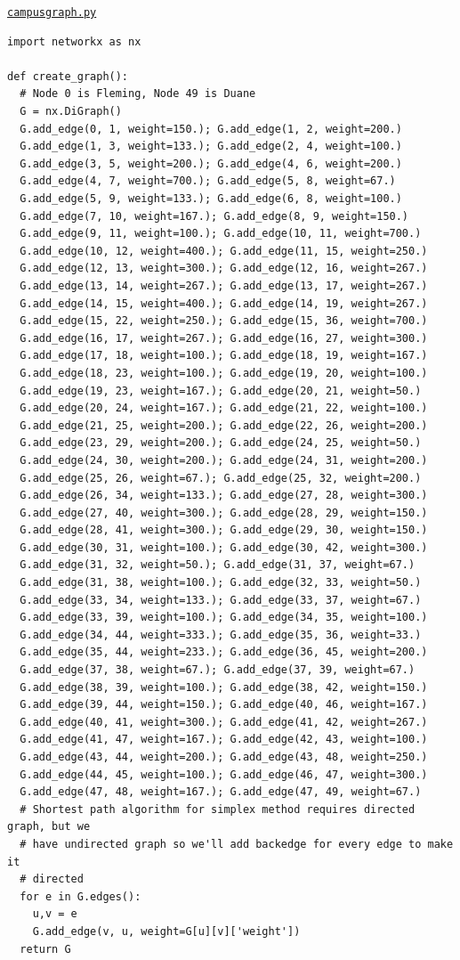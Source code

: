 \newpage
\underline{\texttt{campusgraph.py}}
\begin{footnotesize}
\begin{verbatim}
import networkx as nx

def create_graph():
  # Node 0 is Fleming, Node 49 is Duane
  G = nx.DiGraph()
  G.add_edge(0, 1, weight=150.); G.add_edge(1, 2, weight=200.)
  G.add_edge(1, 3, weight=133.); G.add_edge(2, 4, weight=100.)
  G.add_edge(3, 5, weight=200.); G.add_edge(4, 6, weight=200.)
  G.add_edge(4, 7, weight=700.); G.add_edge(5, 8, weight=67.)
  G.add_edge(5, 9, weight=133.); G.add_edge(6, 8, weight=100.)
  G.add_edge(7, 10, weight=167.); G.add_edge(8, 9, weight=150.)
  G.add_edge(9, 11, weight=100.); G.add_edge(10, 11, weight=700.)
  G.add_edge(10, 12, weight=400.); G.add_edge(11, 15, weight=250.)
  G.add_edge(12, 13, weight=300.); G.add_edge(12, 16, weight=267.)
  G.add_edge(13, 14, weight=267.); G.add_edge(13, 17, weight=267.)
  G.add_edge(14, 15, weight=400.); G.add_edge(14, 19, weight=267.)
  G.add_edge(15, 22, weight=250.); G.add_edge(15, 36, weight=700.)
  G.add_edge(16, 17, weight=267.); G.add_edge(16, 27, weight=300.)
  G.add_edge(17, 18, weight=100.); G.add_edge(18, 19, weight=167.)
  G.add_edge(18, 23, weight=100.); G.add_edge(19, 20, weight=100.)
  G.add_edge(19, 23, weight=167.); G.add_edge(20, 21, weight=50.)
  G.add_edge(20, 24, weight=167.); G.add_edge(21, 22, weight=100.)
  G.add_edge(21, 25, weight=200.); G.add_edge(22, 26, weight=200.)
  G.add_edge(23, 29, weight=200.); G.add_edge(24, 25, weight=50.)
  G.add_edge(24, 30, weight=200.); G.add_edge(24, 31, weight=200.)
  G.add_edge(25, 26, weight=67.); G.add_edge(25, 32, weight=200.)
  G.add_edge(26, 34, weight=133.); G.add_edge(27, 28, weight=300.)
  G.add_edge(27, 40, weight=300.); G.add_edge(28, 29, weight=150.)
  G.add_edge(28, 41, weight=300.); G.add_edge(29, 30, weight=150.)
  G.add_edge(30, 31, weight=100.); G.add_edge(30, 42, weight=300.)
  G.add_edge(31, 32, weight=50.); G.add_edge(31, 37, weight=67.)
  G.add_edge(31, 38, weight=100.); G.add_edge(32, 33, weight=50.)
  G.add_edge(33, 34, weight=133.); G.add_edge(33, 37, weight=67.)
  G.add_edge(33, 39, weight=100.); G.add_edge(34, 35, weight=100.)
  G.add_edge(34, 44, weight=333.); G.add_edge(35, 36, weight=33.)
  G.add_edge(35, 44, weight=233.); G.add_edge(36, 45, weight=200.)
  G.add_edge(37, 38, weight=67.); G.add_edge(37, 39, weight=67.)
  G.add_edge(38, 39, weight=100.); G.add_edge(38, 42, weight=150.)
  G.add_edge(39, 44, weight=150.); G.add_edge(40, 46, weight=167.)
  G.add_edge(40, 41, weight=300.); G.add_edge(41, 42, weight=267.)
  G.add_edge(41, 47, weight=167.); G.add_edge(42, 43, weight=100.)
  G.add_edge(43, 44, weight=200.); G.add_edge(43, 48, weight=250.)
  G.add_edge(44, 45, weight=100.); G.add_edge(46, 47, weight=300.)
  G.add_edge(47, 48, weight=167.); G.add_edge(47, 49, weight=67.)
  # Shortest path algorithm for simplex method requires directed graph, but we
  # have undirected graph so we'll add backedge for every edge to make it
  # directed
  for e in G.edges():
    u,v = e
    G.add_edge(v, u, weight=G[u][v]['weight'])
  return G
\end{verbatim}
\end{footnotesize}

